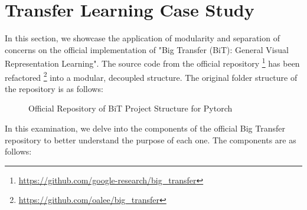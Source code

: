 \section{Transfer Learning Case Study}\label{transfer-study}


In this section, we showcase the application of modularity and separation of concerns on the official implementation of "Big Transfer (BiT): General Visual Representation Learning"\cite{transferlearning}. The source code from the official repository \footnote{\url{https://github.com/google-research/big_transfer}} has been refactored \footnote{\url{https://github.com/oalee/big_transfer}} into a modular, decoupled structure.  The original folder structure of the repository is as follows:


\begin{figure}[H]
\centering
{}
\caption{
Official Repository of BiT Project Structure for Pytorch
}
\end{figure}



\vspace{0.4em}
In this examination, we delve into the components of the official Big Transfer repository to better understand the purpose of each one. The components are as follows:

